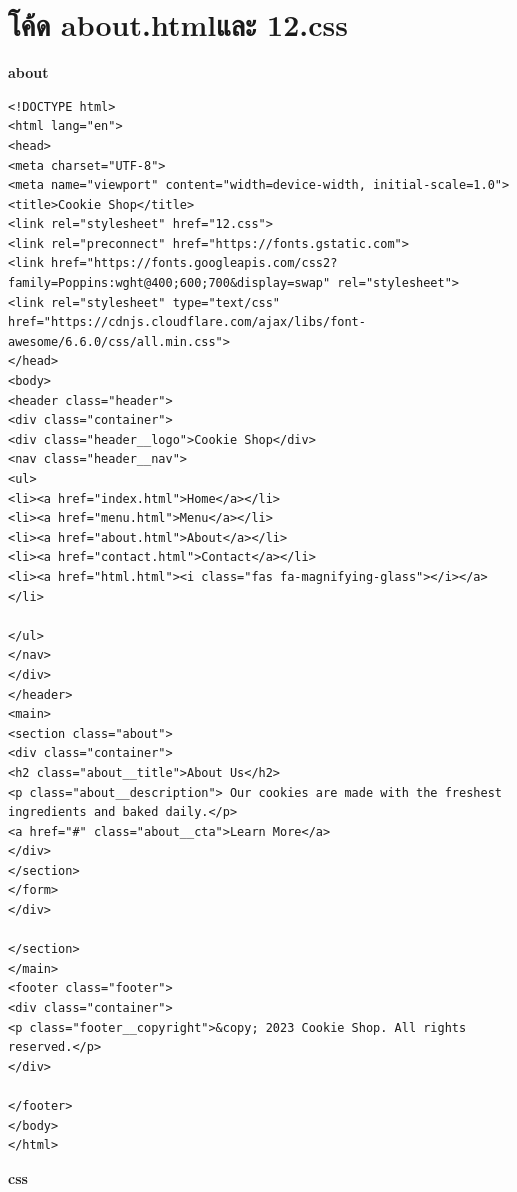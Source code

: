 \documentclass{report}
\begin{document}
\section{โค้ด about.htmlและ 12.css}
\textbf{about}
\begin{verbatim}
<!DOCTYPE html>
<html lang="en">
<head>
<meta charset="UTF-8">
<meta name="viewport" content="width=device-width, initial-scale=1.0">
<title>Cookie Shop</title>
<link rel="stylesheet" href="12.css">
<link rel="preconnect" href="https://fonts.gstatic.com">
<link href="https://fonts.googleapis.com/css2?family=Poppins:wght@400;600;700&display=swap" rel="stylesheet">
<link rel="stylesheet" type="text/css" href="https://cdnjs.cloudflare.com/ajax/libs/font-awesome/6.6.0/css/all.min.css">
</head>
<body>
<header class="header">
<div class="container">
<div class="header__logo">Cookie Shop</div>
<nav class="header__nav">
<ul>
<li><a href="index.html">Home</a></li>
<li><a href="menu.html">Menu</a></li>
<li><a href="about.html">About</a></li>
<li><a href="contact.html">Contact</a></li>
<li><a href="html.html"><i class="fas fa-magnifying-glass"></i></a></li>
 
</ul>
</nav>
</div>
</header>
<main> 
<section class="about">
<div class="container">
<h2 class="about__title">About Us</h2>
<p class="about__description"> Our cookies are made with the freshest ingredients and baked daily.</p>
<a href="#" class="about__cta">Learn More</a>
</div>
</section>
</form>
</div>
 
</section>
</main>
<footer class="footer">
<div class="container">
<p class="footer__copyright">&copy; 2023 Cookie Shop. All rights reserved.</p>
</div>
 
</footer>
</body>
</html>
\end{verbatim}
\textbf{css}
\end{document}
